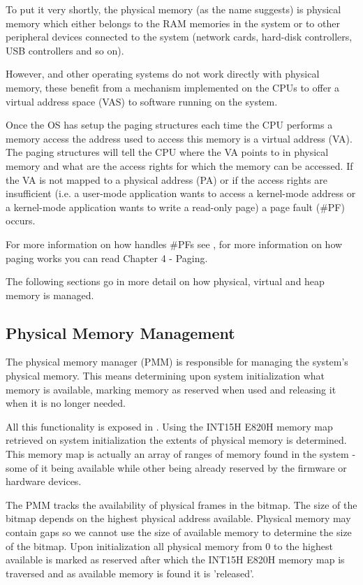 \begin{appendices}
To put it very shortly, the physical memory (as the name suggests) is physical memory which either
belongs to the RAM memories in the system or to other peripheral devices connected to the system
(network cards, hard-disk controllers, USB controllers and so on).

However, \projectname and other operating systems do not work directly with physical memory, these
benefit from a mechanism implemented on the CPUs to offer a virtual address space (VAS) to software
running on the system.

Once the OS has setup the paging structures each time the CPU performs a memory access the address
used to access this memory is a virtual address (VA). The paging structures will tell the CPU
where the VA points to in physical memory and what are the access rights for which the memory can
be accessed. If the VA is not mapped to a physical address (PA) or if the access rights are
insufficient (i.e. a user-mode application wants to access a kernel-mode address or a kernel-mode
application wants to write a read-only page) a page fault (\#PF) occurs.

For more information on how \projectname handles \#PFs see , for more
information on how paging works you can read \cite{intelSys} Chapter 4 - Paging.

The following sections go in more detail on how physical, virtual and heap memory is managed.

\subsection{Physical Memory Management}

The physical memory manager (PMM) is responsible for managing the system's physical memory. This
means determining upon system initialization what memory is available, marking memory as reserved
when used and releasing it when it is no longer needed.

All this functionality is exposed in . Using the INT15H E820H memory map retrieved on
system initialization the extents of physical memory is determined. This memory map is actually an
array of ranges of memory found in the system - some of it being available while other being already
reserved by the firmware or hardware devices.

The PMM tracks the availability of physical frames in the  bitmap.
The size of the bitmap depends on the highest physical address available. Physical memory may 
contain gaps so we cannot use the size of available memory to determine the size of the bitmap.
Upon initialization all physical memory from 0 to the highest available is marked as reserved after
which the INT15H E820H memory map is traversed and as available memory is found it is 'released'.


\end{appendices}
